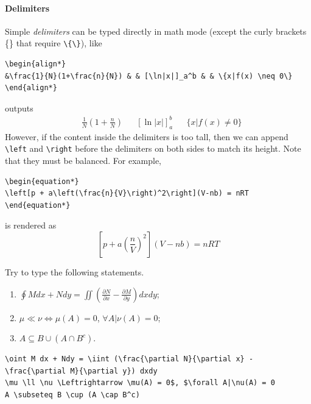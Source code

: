 \paragraph{Delimiters}
Simple \textit{delimiters} can be typed directly in math mode (except the curly brackets \{\} that require \texttt{\textbackslash\{\textbackslash\}}), like
\begin{lstlisting}
\begin{align*}
&\frac{1}{N}(1+\frac{n}{N}) & & [\ln|x|]_a^b & & \{x|f(x) \neq 0\} 
\end{align*}
\end{lstlisting}
outputs
\begin{align*}
&\frac{1}{N}(1+\frac{n}{N}) & & [\ln|x|]_a^b & & \{x|f(x) \neq 0\}  
\end{align*}
However, if the content inside the delimiters is too tall, then we can append \texttt{\textbackslash left} and \texttt{\textbackslash right} before the delimiters on both sides to match its height. Note that they must be balanced. For example,
\begin{lstlisting}
\begin{equation*}
\left[p + a\left(\frac{n}{V}\right)^2\right](V-nb) = nRT
\end{equation*}
\end{lstlisting}
is rendered as
\begin{equation*}
\left[p + a\left(\frac{n}{V}\right)^2\right](V-nb) = nRT
\end{equation*}

\begin{exercisebox}
\begin{Exercise}
Try to type the following statements.
\begin{enumerate}[label=\alph*)]
    \item $\oint M dx + Ndy = \iint (\frac{\partial N}{\partial x} - \frac{\partial M}{\partial y}) dxdy$;
    \item $\mu \ll \nu \Leftrightarrow \mu(A) = 0$, $\forall A|\nu(A) = 0$;
    \item $A \subseteq B \cup (A \cap B^c)$.
\end{enumerate}
\end{Exercise}
\end{exercisebox}
\begin{Answer}
\begin{lstlisting}
\oint M dx + Ndy = \iint (\frac{\partial N}{\partial x} - \frac{\partial M}{\partial y}) dxdy
\mu \ll \nu \Leftrightarrow \mu(A) = 0$, $\forall A|\nu(A) = 0
A \subseteq B \cup (A \cap B^c)
\end{lstlisting}
\end{Answer}

